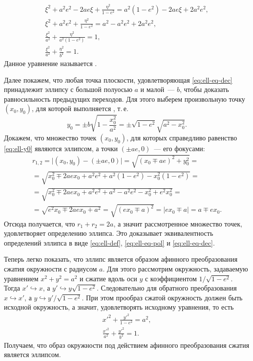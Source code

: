 \begin{gather*}
	\xi^2 + a^2 e^2 - 2ae\xi + \frac{\eta^2}{1 - e^2} = a^2 (1 - e^2) - 2 ae\xi + 2 a^2 e^2,\\
	\xi^2 + a^2 e^2  + \frac{\eta^2}{1 - e^2} = a^2 - a^2 e^2 + 2 a^2 e^2,\\
	\frac{\xi^2}{a^2} + \frac{\eta^2}{a^2 (1 - e^2)} = 1,\\
	\frac{\xi^2}{a^2} + \frac{\eta^2}{b^2} = 1. \tag{\theequation} \label{eq:ell-eq-dec}
\end{gather*}
Данное уравнение называется .

Далее покажем, что любая точка плоскости, удовлетворяющая \eqref{eq:ell-eq-dec} принадлежит эллипсу с большой полуосью $a$ и малой~--- $b$, чтобы доказать равносильность предыдущих переходов. Для этого выберем произвольную точку $(x_0, y_0)$, для которой выполняется \label{eq:ell-eq-dec}, т.\,е.
\begin{equation}
	y_0 = \pm b \sqrt{1 - \frac{x_0^2}{a^2}} = \pm \sqrt{1 - e^2} \sqrt{a^2 - x_0^2}. \label{eq:ell-y0}
\end{equation}
Докажем, что множество точек $(x_0, y_0)$, для которых справедливо равенство \eqref{eq:ell-y0} являются эллипсом, а точки $(\pm a e, 0)$~--- его фокусами:
\begin{multline*}
	r_{1,2}
	= \big| (x_0, y_0) - (\pm ae, 0) \big|
	= \sqrt{(x_0 \mp ae)^2 + y_0^2} =\\
	= \sqrt{x_0^2 \mp 2 a e x_0 + a^2 e^2 + a^2(1 - e^2) - x_0^2(1 - e^2)} =\\
	= \sqrt{x_0^2 \mp 2 a e x_0 + a^2 e^2 + a^2 - a^2 e^2 - x_0^2 + e^2 x_0^2} = \\
	= \sqrt{e^2 x_0 \mp 2 a e x_0 + a^2 } = \sqrt{(e x_0 \mp a)^2} = |e x_0 \mp a| = a \mp ex_0.
\end{multline*}
Отсюда получается, что $r_1 + r_2 = 2a$, а значит рассмотренное множество точек, удовлетворяет определению эллипса. Это доказывает эквивалентность определений эллипса в виде \eqref{eq:ell-def}, \eqref{eq:ell-eq-pol} и \eqref{eq:ell-eq-dec}.

Теперь легко показать, что эллипс является образом афинного преобразования сжатия окружности с радиусом $a$. Для этого рассмотрим окружность, задаваемую уравнением $x^2 + y^2 = a^2$ и сжатие вдоль оси $y$ с коэффициентом $1/\sqrt{1 - e^2}$. Тогда $x' \hookrightarrow x$, а $y' \hookrightarrow y \sqrt{1-e^2}$. Следовательно для обратного преобразования $x \hookrightarrow x'$, а $y \hookrightarrow y'/\sqrt{1 - e^2}$. При этом прообраз сжатой окружность должен быть исходной окружность, а значит, удовлетворять исходному уравнения, то есть
\begin{gather*}
	x'^2 + \frac{y'^2}{1 - e^2} = a^2,\\
	\frac{x'^2}{a^2} + \frac{y'^2}{b^2} = 1.
\end{gather*}
Получаем, что образ окружности под действием афинного преобразования сжатия является эллипсом.

